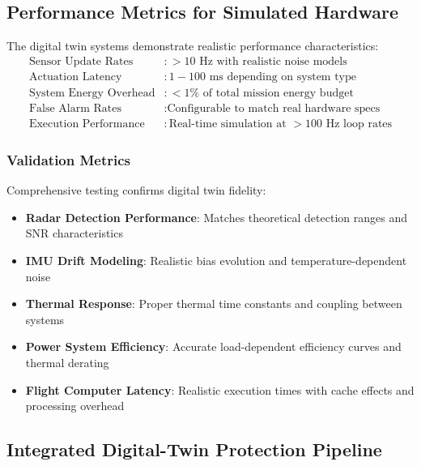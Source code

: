\documentclass[11pt]{article}
\begin{document}
\subsection{Performance Metrics for Simulated Hardware}

The digital twin systems demonstrate realistic performance characteristics:
\begin{align}
\text{Sensor Update Rates} &: >10 \text{ Hz with realistic noise models} \\
\text{Actuation Latency} &: 1-100 \text{ ms depending on system type} \\
\text{System Energy Overhead} &: <1\% \text{ of total mission energy budget} \\
\text{False Alarm Rates} &: \text{Configurable to match real hardware specs} \\
\text{Execution Performance} &: \text{Real-time simulation at }>100 \text{ Hz loop rates}
\end{align}

\subsubsection{Validation Metrics}
Comprehensive testing confirms digital twin fidelity:
\begin{itemize}
\item \textbf{Radar Detection Performance}: Matches theoretical detection ranges and SNR characteristics
\item \textbf{IMU Drift Modeling}: Realistic bias evolution and temperature-dependent noise
\item \textbf{Thermal Response}: Proper thermal time constants and coupling between systems
\item \textbf{Power System Efficiency}: Accurate load-dependent efficiency curves and thermal derating
\item \textbf{Flight Computer Latency}: Realistic execution times with cache effects and processing overhead
\end{itemize}

\subsection{Integrated Digital-Twin Protection Pipeline}
\end{document}
